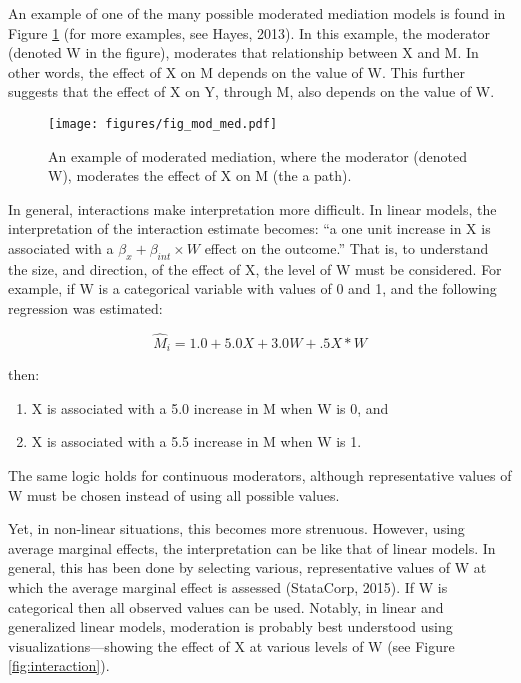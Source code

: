 \documentclass[]{DissertateUSU}
\providecommand{\tightlist}{%
  \setlength{\itemsep}{0pt}\setlength{\parskip}{0pt}}
\begin{document}
An example of one of the many possible moderated mediation models is
found in Figure \ref{fig:modmed} (for more examples, see Hayes, 2013).
In this example, the moderator (denoted W in the figure), moderates that
relationship between X and M. In other words, the effect of X on M
depends on the value of W. This further suggests that the effect of X on
Y, through M, also depends on the value of W.

\begin{figure}[tb]
\centering
\texttt{[image: figures/fig\_mod\_med.pdf]}
\caption{An example of moderated mediation, where the moderator (denoted W), moderates the effect of X on M (the a path).}
\label{fig:modmed}
\end{figure}

In general, interactions make interpretation more difficult. In linear
models, the interpretation of the interaction estimate becomes: ``a one
unit increase in X is associated with a
\(\beta_x + \beta_{int} \times W\) effect on the outcome.'' That is, to
understand the size, and direction, of the effect of X, the level of W
must be considered. For example, if W is a categorical variable with
values of 0 and 1, and the following regression was estimated:

\begin{equation}
\hat{M}_i = 1.0 + 5.0 X + 3.0 W + .5 X*W
\end{equation}

\noindent then:

\begin{enumerate}
\def\labelenumi{\arabic{enumi}.}
\tightlist
\item
  X is associated with a 5.0 increase in M when W is 0, and
\item
  X is associated with a 5.5 increase in M when W is 1.
\end{enumerate}

\noindent The same logic holds for continuous moderators, although
representative values of W must be chosen instead of using all possible
values.

Yet, in non-linear situations, this becomes more strenuous. However,
using average marginal effects, the interpretation can be like that of
linear models. In general, this has been done by selecting various,
representative values of W at which the average marginal effect is
assessed (StataCorp, 2015). If W is categorical then all observed values
can be used. Notably, in linear and generalized linear models,
moderation is probably best understood using visualizations---showing
the effect of X at various levels of W (see Figure
\ref{fig:interaction}).
\end{document}
